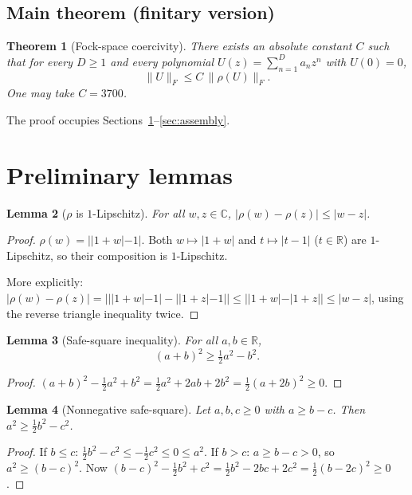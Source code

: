 \documentclass[11pt]{article}
\newtheorem{theorem}{Theorem}[section]
\newtheorem{lemma}[theorem]{Lemma}
\newcommand{\rhof}{\rho}
\newcommand{\norm}[1]{\lVert #1\rVert}
\begin{document}
\subsection{Main theorem (finitary version)}

\begin{theorem}[Fock-space coercivity]\label{thm:main}
There exists an absolute constant $C$ such that for every $D \ge 1$ and every polynomial
$U(z) = \sum_{n=1}^D a_n z^n$ with $U(0) = 0$,
\[
  \norm{U}_F \le C\,\norm{\rhof(U)}_F.
\]
One may take $C = 3700$.
\end{theorem}

The proof occupies Sections~\ref{sec:prelim}--\ref{sec:assembly}.

\section{Preliminary lemmas}\label{sec:prelim}

\begin{lemma}[$\rhof$ is $1$-Lipschitz]\label{lem:lip}
For all $w,z\in\mathbb C$, $|\rhof(w)-\rhof(z)|\le|w-z|$.
\end{lemma}
\begin{proof}
$\rhof(w) = ||1+w|-1|$.  Both $w\mapsto|1+w|$ and $t\mapsto|t-1|$ ($t\in\mathbb R$) are
$1$-Lipschitz, so their composition is $1$-Lipschitz.

More explicitly: $|\rhof(w)-\rhof(z)| = \bigl|||1+w|-1|-||1+z|-1|\bigr|
\le ||1+w|-|1+z|| \le |w-z|$,
using the reverse triangle inequality twice.
\end{proof}

\begin{lemma}[Safe-square inequality]\label{lem:safe-sq}
For all $a,b\in\mathbb R$,
\begin{equation}\label{eq:safe-sq}
  (a+b)^2 \ge \tfrac{1}{2}a^2 - b^2.
\end{equation}
\end{lemma}
\begin{proof}
$(a+b)^2 - \tfrac{1}{2}a^2 + b^2 = \tfrac{1}{2}a^2 + 2ab + 2b^2 = \tfrac{1}{2}(a+2b)^2 \ge 0$.
\end{proof}

\begin{lemma}[Nonnegative safe-square]\label{lem:safe-sq-nonneg}
Let $a,b,c \ge 0$ with $a \ge b - c$.  Then $a^2 \ge \tfrac{1}{2}b^2 - c^2$.
\end{lemma}
\begin{proof}
If $b \le c$: $\tfrac{1}{2}b^2 - c^2 \le -\tfrac{1}{2}c^2 \le 0 \le a^2$.
If $b > c$: $a \ge b-c > 0$, so $a^2 \ge (b-c)^2$.
Now $(b-c)^2 - \tfrac{1}{2}b^2 + c^2 = \tfrac{1}{2}b^2 - 2bc + 2c^2 = \tfrac{1}{2}(b-2c)^2 \ge 0$.
\end{proof}
\end{document}
